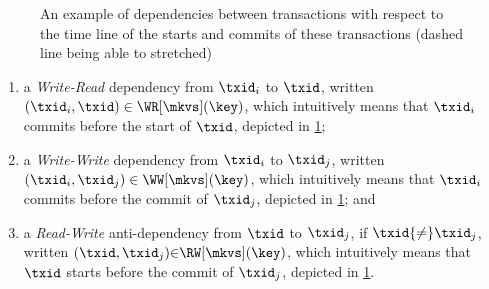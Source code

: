 \begin{figure}[t]
\centering
{}

\vspace*{-10pt}

\hrulefill

\caption{An example of dependencies between transactions with respect to 
the time line of the starts and commits of these transactions 
(dashed line being able to stretched)}
\label{fig:dependencies-time-line}

\end{figure}

\begin{enumerate} 
\item a \emph{Write-Read} dependency from \(\txid_{i}\) to \(\txid\), written \((\txid_{i},\txid) \in \WR[\mkvs](\key)\),
which  intuitively means that \( \txid_{i} \) commits before the start of \( \txid \), depicted in \cref{fig:dependencies-time-line};
\item a \emph{Write-Write} dependency from \(\txid_{i}\) to \(\txid_{j}\), 
written \((\txid_{i},\txid_{j}) \in \WW[\mkvs](\key) \),
which intuitively means that \( \txid_{i} \) commits before the commit of \( \txid_j \), depicted in \cref{fig:dependencies-time-line}; and 
\item a \emph{Read-Write} anti-dependency from \(\txid\) to \(\txid_{j}\), if 
\(\txid {\neq} \txid_{j}\), written \((\txid,\txid_j) {\in} \RW[\mkvs](\key)\),
which intuitively  means that \( \txid \) starts before the commit of \( \txid_j \), depicted in \cref{fig:dependencies-time-line}.
\end{enumerate}

